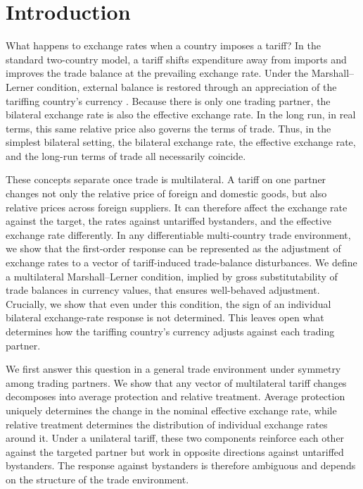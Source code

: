 \section{Introduction}
\label{sec:intro}

What happens to exchange rates when a country imposes a tariff? In the standard two-country model, a tariff shifts expenditure away from imports and improves the trade balance at the prevailing exchange rate. Under the Marshall--Lerner condition, external balance is restored through an appreciation of the tariffing country's currency \citep{dornbusch1974,krugman1982}. Because there is only one trading partner, the bilateral exchange rate is also the effective exchange rate. In the long run, in real terms, this same relative price also governs the terms of trade. Thus, in the simplest bilateral setting, the bilateral exchange rate, the effective exchange rate, and the long-run terms of trade all necessarily coincide.

These concepts separate once trade is multilateral. A tariff on one partner changes not only the relative price of foreign and domestic goods, but also relative prices across foreign suppliers. It can therefore affect the exchange rate against the target, the rates against untariffed bystanders, and the effective exchange rate differently. In any differentiable multi-country trade environment, we show that the first-order response can be represented as the adjustment of exchange rates to a vector of tariff-induced trade-balance disturbances. We define a multilateral Marshall--Lerner condition, implied by gross substitutability of trade balances in currency values, that ensures well-behaved adjustment. Crucially, we show that even under this condition, the sign of an individual bilateral exchange-rate response is not determined. This leaves open what determines how the tariffing country's currency adjusts against each trading partner.

We first answer this question in a general trade environment under symmetry among trading partners. We show that any vector of multilateral tariff changes decomposes into average protection and relative treatment. Average protection uniquely determines the change in the nominal effective exchange rate, while relative treatment determines the distribution of individual exchange rates around it. Under a unilateral tariff, these two components reinforce each other against the targeted partner but work in opposite directions against untariffed bystanders. The response against bystanders is therefore ambiguous and depends on the structure of the trade environment.

